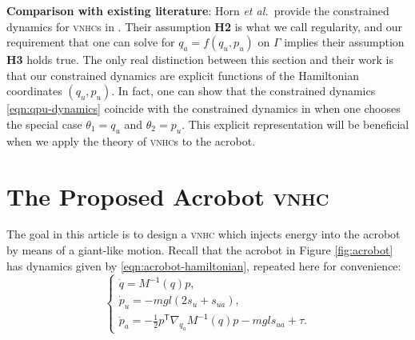 \documentclass[journal,twoside,web, twocolumn,draftcls]{ieeecolor}
\newtheorem{defn}{Definition} %
\newcommand*{\tpose}{^\mathsf{T}}
\newcommand*{\Minv}{M^\mathsf{-1}}
\newcommand*{\etal}{\MakeLowercase{\textit{et al.~}}}
\newcommand*{\vnhc}{\textsc{vnhc}\xspace}
\newcommand*{\vnhcs}{\textsc{vnhc}s\xspace}
\begin{document}


\textbf{Comparison with existing literature}: Horn \etal provide the constrained
dynamics for \vnhcs in \cite{nhvc_incline_walking}.
Their assumption \textbf{H2} is what we call regularity, and our requirement
that one can solve for \(q_a = f(q_u,p_u)\) on \(\Gamma\) implies their
assumption \textbf{H3} holds true.
The only real distinction between this section and their work is that
our constrained dynamics are explicit functions of the Hamiltonian coordinates
\((q_u,p_u)\).
In fact, one can show that the constrained dynamics \eqref{eqn:qpu-dynamics}
coincide with the constrained dynamics in
\cite[Eqn. (17)]{hybrid_zero_dynamics_bipedal_nhvcs}
when one chooses the special case \(\theta_1 = q_u\) and 
\(\theta_2 = p_u\).
This explicit representation will be beneficial when we apply the theory of
\vnhcs to the acrobot.

\section{The Proposed Acrobot \vnhc}\label{sec:acrobot}

The goal in this article is to design a \vnhc which injects energy into the
acrobot by means of a giant-like motion.
Recall that the acrobot in Figure \ref{fig:acrobot} has dynamics given by
\eqref{eqn:acrobot-hamiltonian}, repeated here for convenience:
    \begin{equation*}
     \begin{cases}
        \dot{q} = \Minv(q) p 
        ,\\
        \dot{p}_u = -mgl\left(2s_u + s_{ua}\right) 
        ,\\
        \dot{p}_a =-\frac{1}{2}p\tpose \nabla_{q_a}\Minv(q) p
        - mgl s_{ua} + \tau.
    \end{cases}
\end{equation*}
\end{document}
